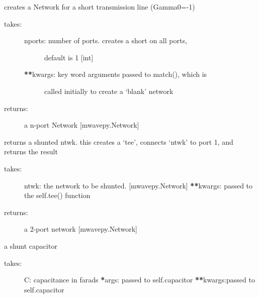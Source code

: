 \documentclass[letterpaper,10pt,english]{sphinxmanual}
\begin{document}
\begin{fulllineitems}

\begin{fulllineitems}
\label{api/mwavepy.media:mwavepy.media.media.Media.short}
creates a Network for a short  transmission line (Gamma0=-1)
\begin{description}
\item[{takes:}] \leavevmode\begin{description}
\item[{nports: number of ports. creates a short on all ports,}] \leavevmode
default is 1 {[}int{]}

\item[{{\color{red}\bfseries{}**}kwargs: key word arguments passed to match(), which is }] \leavevmode
called initially to create a `blank' network

\end{description}

\item[{returns:}] \leavevmode
a n-port Network {[}mwavepy.Network{]}

\end{description}

\end{fulllineitems}


\begin{fulllineitems}
\label{api/mwavepy.media:mwavepy.media.media.Media.shunt}
returns a shunted ntwk. this creates a `tee', connects 
`ntwk' to port 1, and returns the result
\begin{description}
\item[{takes:}] \leavevmode
ntwk: the network to be shunted. {[}mwavepy.Network{]}
{\color{red}\bfseries{}**}kwargs: passed to the self.tee() function

\item[{returns:}] \leavevmode
a 2-port network {[}mwavepy.Network{]}

\end{description}

\end{fulllineitems}


\begin{fulllineitems}
\label{api/mwavepy.media:mwavepy.media.media.Media.shunt_capacitor}
a shunt capacitor
\begin{description}
\item[{takes:}] \leavevmode
C: capacitance in farads
{\color{red}\bfseries{}*}args: passed to self.capacitor
{\color{red}\bfseries{}**}kwargs:passed to self.capacitor


\end{description}
\end{fulllineitems}
\end{fulllineitems}
\end{document}
